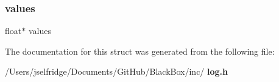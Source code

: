 \mbox{\label{structlog__param__struct_ae2c4a32612e8caa268af840efafef669}} 
\subsubsection{values}
{\footnotesize\ttfamily float$\ast$ values}



The documentation for this struct was generated from the following file\+:\begin{DoxyCompactItemize}
\item 
/\+Users/jselfridge/\+Documents/\+Git\+Hub/\+Black\+Box/inc/\textbf{ log.\+h}\end{DoxyCompactItemize}
